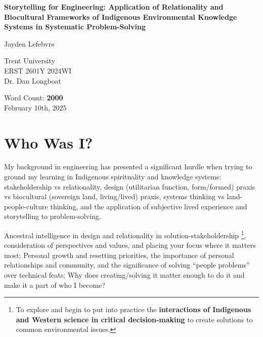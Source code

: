 \documentclass{report}
\begin{document}
\begin{titlepage}
    \begin{center}
        \vspace*{1.2cm}

        \textbf{Storytelling for Engineering: Application of Relationality and Biocultural Frameworks of Indigenous Environmental Knowledge Systems in Systematic Problem-Solving}

        \vspace{1.25cm}

        Jayden Lefebvre\\

        \vspace{5cm}
        
        Trent University\\
        ERST 2601Y 2024WI\\
        Dr. Dan Longboat\\

        \vfill

        Word Count: \textbf{2000}\\
        February 10th, 2025
        
    \end{center}
\end{titlepage}

\clearpage

\section{Who Was I?}

My background in engineering has presented a significant hurdle when trying to ground my learning in Indigenous spirituality and knowledge systems: stakeholdership vs relationality, design (utilitarian function, form/formed) praxis vs biocultural (sovereign land, living/lived) praxis, systems thinking vs land-people-culture thinking, and the application of subjective lived experience and storytelling to problem-solving.

Ancestral intelligence in design and relationality in solution-stakeholdership \footnote{To explore and begin to put into practice the \textbf{interactions of Indigenous and Western science in critical decision-making} to create solutions to common environmental issues.}, consideration of perspectives and values, and placing your focus where it matters most; Personal growth and resetting priorities, the importance of personal relationships and community, and the significance of solving ``people problems'' over technical feats; Why does creating/solving it matter enough to do it and make it a part of who I become?
\end{document}
